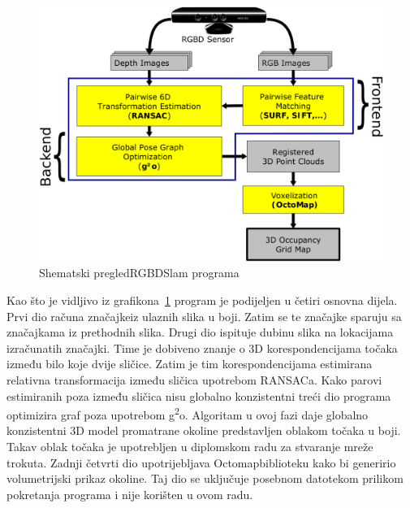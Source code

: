 \begin{figure}[h]
\renewcommand{\figurename}{Grafikon}
\centering
\includegraphics[scale=0.27]{figures/rgbdslam-overview.png}
\caption[]{Shematski pregled\footnotemark[1] RGBDSlam programa}
\label{fig:rgbdslam-overview}
\end{figure}


Kao što je vidljivo iz grafikona~\ref{fig:rgbdslam-overview} program je
podijeljen u četiri osnovna dijela. Prvi dio računa
značajke\footnotemark[2] iz ulaznih slika u boji. Zatim se te značajke
sparuju sa značajkama iz prethodnih slika. Drugi dio ispituje dubinu
slika na lokacijama izračunatih značajki. Time je dobiveno znanje o 
3D korespondencijama točaka između bilo koje dvije sličice. Zatim je tim
korespondencijama estimirana relativna transformacija između sličica
upotrebom RANSACa\footnotemark[3]. Kako parovi estimiranih poza između
sličica nisu globalno konzistentni treći dio programa optimizira graf
poza upotrebom g\textsuperscript{2}o\footnotemark[4]. Algoritam u ovoj
fazi daje globalno konzistentni 3D model promatrane okoline predstavljen
oblakom točaka u boji. Takav oblak točaka je upotrebljen u diplomskom
radu za stvaranje mreže trokuta. Zadnji četvrti dio upotrijebljava 
Octomap\footnotemark[5] biblioteku kako bi generirio volumetrijski
prikaz okoline. Taj dio se uključuje posebnom datotekom prilikom
pokretanja programa i nije korišten u ovom radu.

